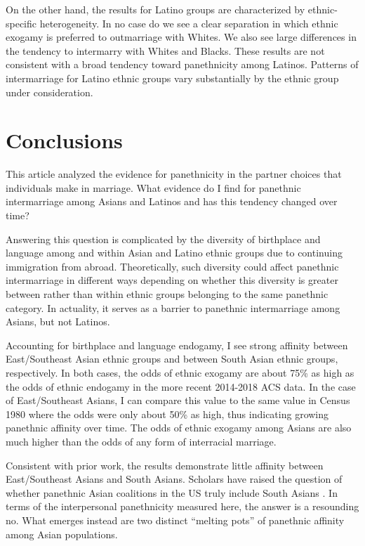\documentclass[11pt,]{article}
\begin{document}
On the other hand, the results for Latino groups are characterized by ethnic-specific heterogeneity. In no case do we see a clear separation in which ethnic exogamy is preferred to outmarriage with Whites. We also see large differences in the tendency to intermarry with Whites and Blacks. These results are not consistent with a broad tendency toward panethnicity among Latinos. Patterns of intermarriage for Latino ethnic groups vary substantially by the ethnic group under consideration.

\hypertarget{conclusions}{%
\section{Conclusions}\label{conclusions}}

This article analyzed the evidence for panethnicity in the partner choices that individuals make in marriage. What evidence do I find for panethnic intermarriage among Asians and Latinos and has this tendency changed over time?

Answering this question is complicated by the diversity of birthplace and language among and within Asian and Latino ethnic groups due to continuing immigration from abroad. Theoretically, such diversity could affect panethnic intermarriage in different ways depending on whether this diversity is greater between rather than within ethnic groups belonging to the same panethnic category. In actuality, it serves as a barrier to panethnic intermarriage among Asians, but not Latinos.

Accounting for birthplace and language endogamy, I see strong affinity between East/Southeast Asian ethnic groups and between South Asian ethnic groups, respectively. In both cases, the odds of ethnic exogamy are about 75\% as high as the odds of ethnic endogamy in the more recent 2014-2018 ACS data. In the case of East/Southeast Asians, I can compare this value to the same value in Census 1980 where the odds were only about 50\% as high, thus indicating growing panethnic affinity over time. The odds of ethnic exogamy among Asians are also much higher than the odds of any form of interracial marriage.

Consistent with prior work, the results demonstrate little affinity between East/Southeast Asians and South Asians. Scholars have raised the question of whether panethnic Asian coalitions in the US truly include South Asians \citep{kibria_not_1996}. In terms of the interpersonal panethnicity measured here, the answer is a resounding no. What emerges instead are two distinct ``melting pots'' of panethnic affinity among Asian populations.
\end{document}
